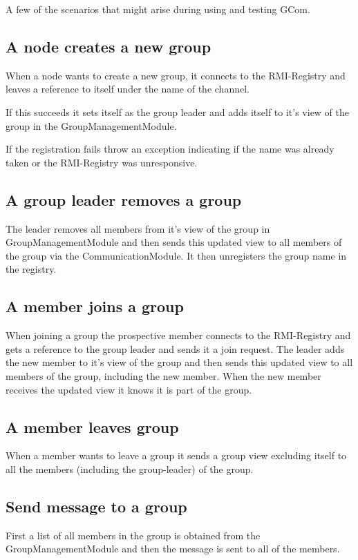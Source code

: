 \documentclass[11pt,swedish]{article}
\begin{document}
A few of the scenarios that might arise during using and testing GCom.

\subsection{A node creates a new group}
When a node wants to create a new group, it connects to the RMI-Registry and leaves a reference to itself under the name of the channel.

If this succeeds it sets itself as the group leader and adds itself to it's view of the group in the GroupManagementModule.

If the registration fails throw an exception indicating if the name was already taken or the RMI-Registry was unresponsive.

\subsection{A group leader removes a group}
The leader removes all members from it's view of the group in GroupManagementModule and then sends this updated view to all members of the group via the CommunicationModule. It then unregisters the group name in the registry.

\subsection{A member joins a group}
When joining a group the prospective member connects to the RMI-Registry and gets a reference to the group leader and sends it a join request. The leader adds the new member to it's view of the group and then sends this updated view to all members of the group, including the new member. When the new member receives the updated view it knows it is part of the group.

\subsection{A member leaves group}
When a member wants to leave a group it sends a group view excluding itself to all the members (including the group-leader) of the group.

\subsection{Send message to a group}
First a list of all members in the group is obtained from the GroupManagementModule and then the message is sent to all of the members.
\end{document}
